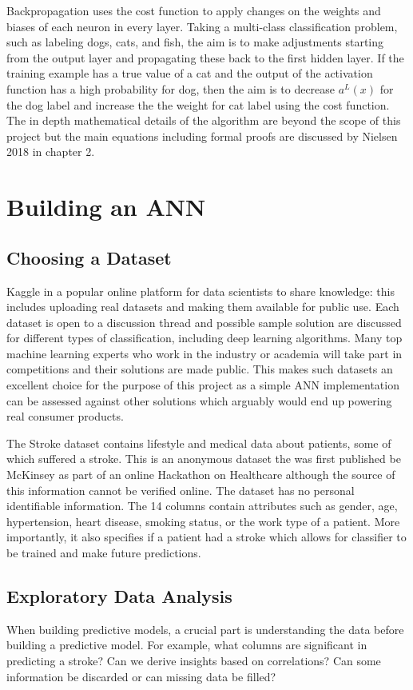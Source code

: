\documentclass[proposal]{softeng}
\begin{document}
Backpropagation uses the cost function to apply changes on the weights and biases of each neuron in every layer. Taking a multi-class classification problem, such as labeling dogs, cats, and fish, the aim is to make adjustments starting from the output layer and propagating these back to the first hidden layer. If the training example has a true value of a cat and the output of the activation function has a high probability for dog, then the aim is to decrease \( a^L(x) \) for the dog label and increase the the weight for cat label using the cost function. The in depth mathematical details of the algorithm are beyond the scope of this project but the main equations including formal proofs are discussed by Nielsen 2018 \cite{nielsenneural} in chapter 2.

\section{Building an ANN}
\subsection{Choosing a Dataset}
Kaggle\cite{kaggle} in a popular online platform for data scientists to share knowledge: this includes uploading real datasets and making them available for public use. Each dataset is open to a discussion thread and possible sample solution are discussed for different types of classification, including deep learning algorithms. Many top machine learning experts who work in the industry or academia will take part in competitions and their solutions are made public. This makes such datasets an excellent choice for the purpose of this project as a simple ANN implementation can be assessed against other solutions which arguably would end up powering real consumer products.

The Stroke dataset\cite{strokedataset} contains lifestyle and medical data about patients, some of which suffered a stroke. This is an anonymous dataset the was first published be McKinsey as part of an online Hackathon on Healthcare although the source of this information cannot be verified online. The dataset has no personal identifiable information. The 14 columns contain attributes such as gender, age, hypertension, heart disease, smoking status, or the work type of a patient. More importantly, it also specifies if a patient had a stroke which allows for classifier to be trained and make future predictions.

\subsection{Exploratory Data Analysis}
When building predictive models, a crucial part is understanding the data before building a predictive model. For example, what columns are significant in predicting a stroke? Can we derive insights based on correlations? Can some information be discarded or can missing data be filled? 
\end{document}
